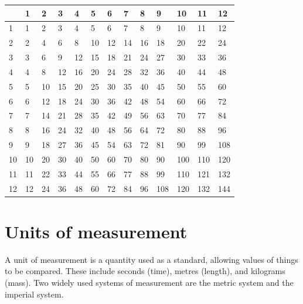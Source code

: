 \documentclass[10pt]{article}
\begin{document}
\begin{center}
\begin{tabular}{|l|l|l|l|l|l|l|l|l|l|l|l|l|}
\hline
 & 1 & 2 & 3 & 4 & 5 & 6 & 7 & 8 & 9 & 10 & 11 & 12 \\
\hline
1 & 1 & 2 & 3 & 4 & 5 & 6 & 7 & 8 & 9 & 10 & 11 & 12 \\
\hline
2 & 2 & 4 & 6 & 8 & 10 & 12 & 14 & 16 & 18 & 20 & 22 & 24 \\
\hline
3 & 3 & 6 & 9 & 12 & 15 & 18 & 21 & 24 & 27 & 30 & 33 & 36 \\
\hline
4 & 4 & 8 & 12 & 16 & 20 & 24 & 28 & 32 & 36 & 40 & 44 & 48 \\
\hline
5 & 5 & 10 & 15 & 20 & 25 & 30 & 35 & 40 & 45 & 50 & 55 & 60 \\
\hline
6 & 6 & 12 & 18 & 24 & 30 & 36 & 42 & 48 & 54 & 60 & 66 & 72 \\
\hline
7 & 7 & 14 & 21 & 28 & 35 & 42 & 49 & 56 & 63 & 70 & 77 & 84 \\
\hline
8 & 8 & 16 & 24 & 32 & 40 & 48 & 56 & 64 & 72 & 80 & 88 & 96 \\
\hline
9 & 9 & 18 & 27 & 36 & 45 & 54 & 63 & 72 & 81 & 90 & 99 & 108 \\
\hline
10 & 10 & 20 & 30 & 40 & 50 & 60 & 70 & 80 & 90 & 100 & 110 & 120 \\
\hline
11 & 11 & 22 & 33 & 44 & 55 & 66 & 77 & 88 & 99 & 110 & 121 & 132 \\
\hline
12 & 12 & 24 & 36 & 48 & 60 & 72 & 84 & 96 & 108 & 120 & 132 & 144 \\
\hline
\end{tabular}
\end{center}

\section*{Units of measurement}
A unit of measurement is a quantity used as a standard, allowing values of things to be compared. These include seconds (time), metres (length), and kilograms (mass). Two widely used systems of measurement are the metric system and the imperial system.
\end{document}
